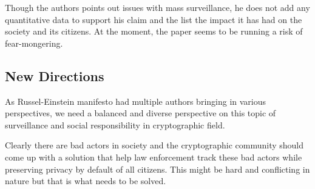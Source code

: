 \documentclass[12pt]{article}
\begin{document}
    Though the authors points out issues with mass surveillance, he does not add any quantitative data to support his claim and the list the impact it has had on the society and its citizens. At the moment, the paper seems to be running a risk of fear-mongering.

    \subsection*{New Directions}
    As Russel-Einstein manifesto had multiple authors bringing in various perspectives, we need a balanced and diverse perspective on this topic of surveillance and social responsibility in cryptographic field.

    Clearly there are bad actors in society and the cryptographic community should come up with a solution that help law enforcement track these bad actors while preserving privacy by default of all citizens. This might be hard and conflicting in nature but that is what needs to be solved.
\end{document}
